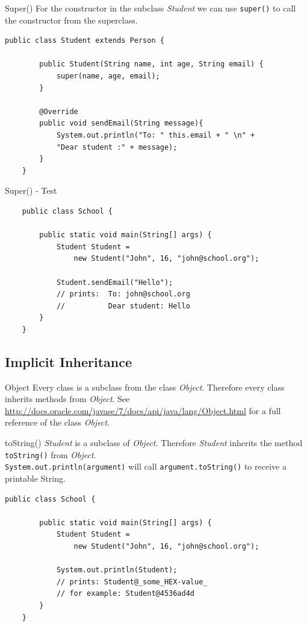 \begin{frame}[fragile]{Super()}
	For the constructor in the subclass \emph{Student} we can use \texttt{super()} to call the constructor
	from the superclass.
	\begin{lstlisting}[escapechar=!]
	public class Student extends Person {

	    public Student(String name, int age, String email) {
	    	super(name, age, email);
	    }
	
	    @Override
	    public void sendEmail(String message){
	    	System.out.println("To: " this.email + " \n" +
	    	"Dear student :" + message);
	    }	
	}
	\end{lstlisting}
\end{frame}

\begin{frame}[fragile]{Super() - Test}
	\begin{lstlisting}
	public class School {
	    
	    public static void main(String[] args) {	    
	        Student Student = 
	            new Student("John", 16, "john@school.org");
	        
	        Student.sendEmail("Hello");
	        // prints: 	To: john@school.org
	        //			Dear student: Hello
	    }
	}
	\end{lstlisting}
\end{frame}

\subsection{Implicit Inheritance}
\begin{frame}{Object}
	Every class is a subclass from the class \emph{Object}. 
	Therefore every class inherits methods from \emph{Object}.
	\vfill
	See \scriptsize\url{http://docs.oracle.com/javase/7/docs/api/java/lang/Object.html} \normalsize for
	a full reference of the class \emph{Object}.
\end{frame}

\begin{frame}[fragile]{toString()}
	\emph{Student} is a subclass of \emph{Object}.
	Therefore \emph{Student} inherits the method \texttt{toString()} from \emph{Object}.\\
	\texttt{System.out.println(argument)} will call \texttt{argument.toString()} to receive
	a printable String.
	\begin{lstlisting}[escapechar=!]
	public class School {
	    
	    public static void main(String[] args) {	    
	        Student Student = 
	            new Student("John", 16, "john@school.org");
	        
	        System.out.println(Student);
	        // prints: Student@_some_HEX-value_
	        // for example: Student@4536ad4d
	    }
	}
	\end{lstlisting}
\end{frame}

